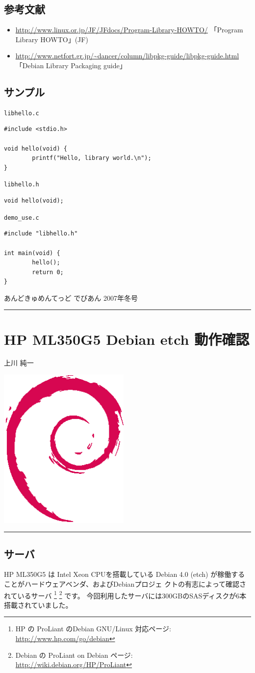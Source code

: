 \documentclass[mingoth,a4paper]{jsarticle}
\renewcommand{\dancersection}[2]{%
\newpage
あんどきゅめんてっど でびあん 2007年冬号
%
\vspace{0.1mm}\\
{\color{dancerlightblue}\rule{\hsize}{2mm}}

%
%
\begin{minipage}[t]{0.7\hsize}
\color{dancerdarkblue}
\vspace{1cm}
\section{#1}
\hfill{}#2\\
\end{minipage}
\begin{minipage}[t]{0.3\hsize}
\vspace{-2cm}
\hfill{}\includegraphics[height=8cm]{image200502/openlogo-nd.eps}\\
\vspace{-5cm}
\end{minipage}
%
%
{\color{dancerdarkblue}\rule{0.74\hsize}{2mm}}
%
\vspace{2cm}
}
\begin{document}
\subsection{参考文献}

\begin{itemize}
\item \url{http://www.linux.or.jp/JF/JFdocs/Program-Library-HOWTO/}
  「Program Library HOWTO」(JF)
\item \url{http://www.netfort.gr.jp/~dancer/column/libpkg-guide/libpkg-guide.html}
  「Debian Library Packaging guide」
\end{itemize}


\subsection{サンプル}


\begin{itembox}{\texttt{libhello.c}}
\begin{verbatim}
#include <stdio.h>

void hello(void) {
        printf("Hello, library world.\n");
}
\end{verbatim}
\end{itembox}

\begin{itembox}{\texttt{libhello.h}}
\begin{verbatim}
void hello(void);
\end{verbatim}
\end{itembox}

\begin{itembox}{\texttt{demo\_use.c}}
\begin{verbatim}
#include "libhello.h"

int main(void) {
        hello();
        return 0;
}
\end{verbatim}
\end{itembox}

\newpage

\dancersection{HP ML350G5 Debian etch 動作確認}{上川 純一}
\label{ml350g5}

\subsection{サーバ}

HP ML350G5 は Intel Xeon CPUを搭載している
Debian 4.0 (etch) が稼働することがハードウェアベンダ、およびDebianプロジェ
クトの有志によって確認されているサーバ
\footnote{HP の ProLiant のDebian GNU/Linux 対応ページ:
\url{http://www.hp.com/go/debian}}
\footnote{Debian の ProLiant on Debian ページ:
\url{http://wiki.debian.org/HP/ProLiant}}
です。
今回利用したサーバには300GBのSASディスクが6本搭載されていました。
\end{document}
